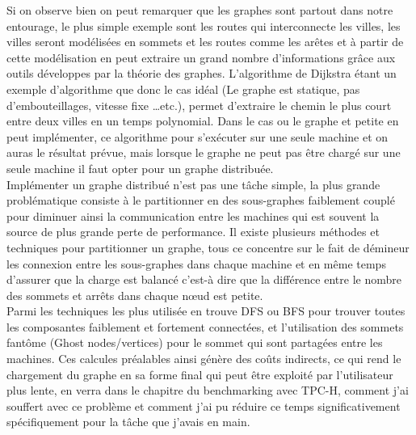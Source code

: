 Si on observe bien on peut remarquer que les graphes sont partout dans notre entourage, le plus simple exemple sont les routes qui interconnecte les villes, les villes seront modélisées en sommets et les routes comme les arêtes et à partir de cette modélisation en peut extraire un grand nombre d’informations grâce aux outils développes par la théorie des graphes. L’algorithme de Dijkstra étant un exemple d’algorithme que donc le cas idéal (Le graphe est statique, pas d’embouteillages, vitesse fixe …etc.), permet d’extraire le chemin le plus court entre deux villes en un temps polynomial. Dans le cas ou le graphe et petite en peut implémenter, ce algorithme pour s’exécuter sur une seule machine et on auras le résultat prévue, mais lorsque le graphe ne peut pas être chargé sur une seule machine il faut opter pour un graphe distribuée.\\
Implémenter un graphe distribué n’est pas une tâche simple, la plus grande problématique consiste à le partitionner en des sous-graphes faiblement couplé pour diminuer ainsi la communication entre les machines qui est souvent la source de plus grande perte de performance. Il existe plusieurs méthodes et techniques pour partitionner un graphe, tous ce concentre sur le fait de démineur les connexion entre les sous-graphes dans chaque machine et en même temps d’assurer que la charge est balancé c’est-à dire que la différence entre le nombre des sommets et arrêts dans chaque nœud est petite.\\
Parmi les techniques les plus utilisée en trouve DFS ou BFS pour trouver toutes les composantes faiblement et fortement connectées, et l’utilisation des sommets fantôme (Ghost nodes/vertices) pour le sommet qui sont partagées entre les machines. Ces calcules préalables ainsi génère des coûts indirects, ce qui rend le chargement du graphe en sa forme final qui peut être exploité par l’utilisateur plus lente, en verra dans le chapitre du benchmarking avec TPC-H, comment j’ai souffert avec ce problème et comment j’ai pu réduire ce temps significativement spécifiquement pour la tâche que j’avais en main.\\
